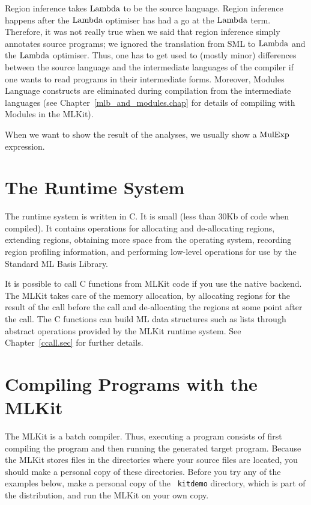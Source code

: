 \documentclass[12pt]{book}
\begin{document}
Region inference takes $\hbox{\rm Lambda}$ to be the source language. Region
inference happens after the $\hbox{\rm Lambda}$ optimiser has had a go at the
$\hbox{\rm Lambda}$ term.  Therefore, it was not really true when we said that
region inference simply annotates source programs; we ignored the
translation from SML to $\hbox{\rm Lambda}$ and the $\hbox{\rm Lambda}$ optimiser. Thus, one has
to get used to (mostly minor) differences between the source language
and the intermediate languages of the compiler if one wants to read
programs in their intermediate forms. Moreover,
%
Modules Language constructs are eliminated during compilation from the
intermediate languages (see Chapter~\ref{mlb_and_modules.chap}
for details of compiling with Modules in the MLKit).

When we want to show the result of the analyses, we usually show a
$\hbox{\rm MulExp}$ expression.

\section{The Runtime System}
The
%
runtime system is written in C. It is small (less than 30Kb of code
when compiled).  It contains operations for allocating and
de-allocating regions, extending regions, obtaining more space from
the operating system, recording region profiling information, and
performing low-level operations for use by the Standard ML Basis
Library.

It is possible to call
%
C functions from MLKit code if you use the native backend.  The MLKit
takes care of the memory allocation, by allocating regions for the
result of the call before the call and de-allocating the regions at
some point after the call.  The C functions can build ML data
structures such as lists through abstract operations provided by the
MLKit runtime system. See Chapter~\ref{ccall.sec} for further details.

\section{Compiling Programs with the MLKit}
\label{tryit.sec}

The MLKit is a
%
batch compiler. Thus, executing a program consists of first compiling
the program and then running the generated target program. Because the
MLKit stores files in the directories where your source files are
located, you should make a personal copy of these directories.  Before
you try any of the examples below, make a personal copy of the {\tt
  kitdemo} directory, which is part of the distribution, and run the
MLKit on your own copy.
\end{document}
